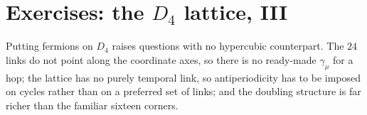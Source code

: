 \section*{Exercises: the \texorpdfstring{$D_4$}{D4} lattice, III}

Putting fermions on $D_4$ raises questions with no hypercubic counterpart. The
$24$ links do not point along the coordinate axes, so there is no ready-made
$\gamma_\mu$ for a hop; the lattice has no purely temporal link, so
antiperiodicity has to be imposed on cycles rather than on a preferred set of
links; and the doubling structure is far richer than the familiar sixteen
corners.


